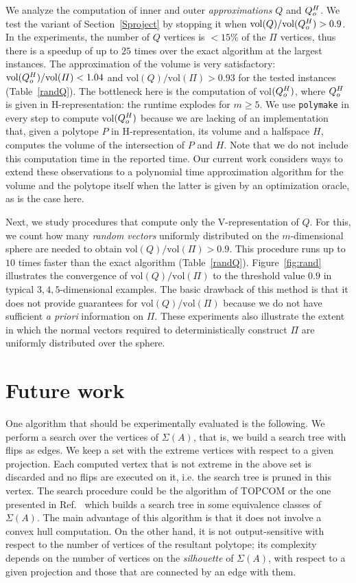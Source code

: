 \documentclass{article}
\newcommand\refcite[1]{\citealp{#1}} \newcommand\citess[1]{\textsuperscript{\textup{\citealp{#1}}}}
\begin{document}
We analyze the computation of inner and
outer \textit{approximations} $Q$ and $Q_o^{H}$.
We test the variant of Section~\ref{Sproject} by
stopping it when $\mbox{vol}(Q)/\mbox{vol}(Q_o^{H})>0.9$. In the
experiments, the number of $Q$ vertices is $<15\%$ of the 
$\varPi$ vertices, thus there is a speedup of up to $25$ times over
the exact algorithm at the largest instances.
The approximation of the volume is very satisfactory:
$\mbox{vol}(Q_o^{H})/\mbox{vol}(\varPi)<1.04$ and
$\mbox{vol}(Q)/\mbox{vol}(\varPi) > 0.93$ 
for the tested instances (Table~\ref{randQ}).
The bottleneck here is the computation of
vol$(Q_o^{H})$, where
$Q_o^{H}$ is given in H-representation: the runtime explodes for $m\ge 5$.
We use 
{\tt polymake} in every step to
compute vol$(Q_o^{H})$ because we are lacking of an implementation that, given a
polytope $P$ in H-representation, its volume and a halfspace $H$, computes the
volume of the intersection of $P$ and $H$.
Note that we do not include this computation time in the reported time.
Our current work considers ways to extend these observations to a polynomial
time approximation algorithm for the volume and the polytope itself when the
latter is given by an optimization oracle, as is the case here.

Next, we study procedures that compute only the V-rep\-re\-sen\-ta\-tion of
$Q$.
For this, we count 
how many \textit{random vectors} uniformly distributed on the
$m$-dimensional sphere are needed to obtain
$\mbox{vol}(Q)/\mbox{vol}(\varPi)>0.9$. 
This procedure runs up to $10$ times faster than the exact algorithm
(Table~\ref{randQ}). 
Figure~\ref{fig:rand} illustrates the convergence of
$\mbox{vol}(Q)/\mbox{vol}(\varPi)$ to the threshold value $0.9$ in
typical $3,4,5$-dimensional examples. 
The basic drawback of this method is that it does not provide guarantees for
$\mbox{vol}(Q)/\mbox{vol}(\varPi)$ because we do not have sufficient
{\em a priori} information on $\varPi$.
These experiments also illustrate the extent in which
the normal vectors required to deterministically construct $\varPi$
are uniformly distributed over the sphere.


\section{Future work}

One algorithm that should be experimentally evaluated is the following. 
We perform a search over the vertices of $\Sigma(A)$, that is, we build a search
tree with flips as edges. We keep a set with the extreme vertices with respect
to a given projection. Each computed vertex that is not extreme in the above set is
discarded and no flips are executed on it, i.e. the search tree is pruned in
this vertex. The search procedure could be the algorithm of TOPCOM or the one
presented in Ref.~\refcite{MicVer99} which builds a search
tree in some equivalence classes of $\Sigma(A)$. The main advantage of this
algorithm is that it does not involve a convex hull computation. On the other
hand, it is not output-sensitive with respect to 
the number of vertices of the resultant polytope;
its complexity depends on the number of vertices on the \emph{silhouette}
of $\Sigma(A)$, with respect to a given projection and those that 
are connected by an edge with them.
\end{document}
